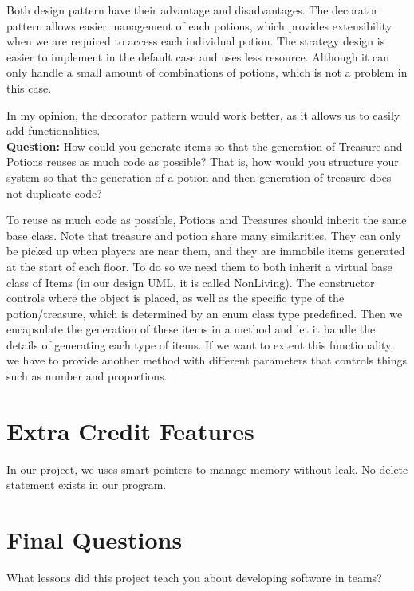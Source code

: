 \documentclass[11pt]{article}
\theoremstyle{plain} \newtheorem{theorem*}{Theorem}[subsection]
\begin{document}
Both design pattern have their advantage and disadvantages. The decorator
pattern allows easier management of each potions, which provides extensibility
when we are required to access each individual potion. The strategy design is
easier to implement in the default case and uses less resource. Although it can
only handle a small amount of combinations of potions, which is not a problem
in this case.  

In my opinion, the decorator pattern would work better, as it allows us to
easily add functionalities. \\

\textbf{Question:}
How could you generate items so that the generation of Treasure and Potions
reuses as much code as possible? That is, how would you structure your system
so that the generation of a potion and then generation of treasure does not
duplicate code? 

To reuse as much code as possible, Potions and Treasures should inherit the
same base class. Note that treasure and potion share many similarities. They
can only be picked up when players are near them, and they are immobile items
generated at the start of each floor. To do so we need them to both inherit a
virtual base class of Items (in our design UML, it is called NonLiving). The
constructor controls where the object is placed, as well as the specific type
of the potion/treasure, which is determined by an enum class type predefined.
Then we encapsulate the generation of these items in a method and let it handle
the details of generating each type of items. If we want to extent this
functionality, we have to provide another method with different parameters that
controls things such as number and proportions. 



\section{Extra Credit Features }

In our project, we uses smart pointers to manage memory without leak. No delete
statement exists in our program.  




\section{Final Questions}

What lessons did this project teach you about developing software in teams? 
\end{document}
